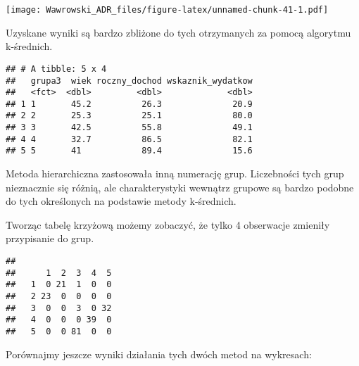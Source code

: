 \documentclass[]{book}
\newenvironment{Shaded}{\begin{snugshade}}{\end{snugshade}}
\newcommand{\KeywordTok}[1]{\textcolor[rgb]{0.13,0.29,0.53}{\textbf{#1}}}
\newcommand{\DataTypeTok}[1]{\textcolor[rgb]{0.13,0.29,0.53}{#1}}
\newcommand{\StringTok}[1]{\textcolor[rgb]{0.31,0.60,0.02}{#1}}
\newcommand{\OperatorTok}[1]{\textcolor[rgb]{0.81,0.36,0.00}{\textbf{#1}}}
\newcommand{\NormalTok}[1]{#1}
\begin{document}
\texttt{[image: Wawrowski\_ADR\_files/figure-latex/unnamed-chunk-41-1.pdf]}

Uzyskane wyniki są bardzo zbliżone do tych otrzymanych za pomocą
algorytmu k-średnich.

\begin{Shaded}
\end{Shaded}

\begin{verbatim}
## # A tibble: 5 x 4
##   grupa3  wiek roczny_dochod wskaznik_wydatkow
##   <fct>  <dbl>         <dbl>             <dbl>
## 1 1       45.2          26.3              20.9
## 2 2       25.3          25.1              80.0
## 3 3       42.5          55.8              49.1
## 4 4       32.7          86.5              82.1
## 5 5       41            89.4              15.6
\end{verbatim}

Metoda hierarchiczna zastosowała inną numerację grup. Liczebności tych
grup nieznacznie się różnią, ale charakterystyki wewnątrz grupowe są
bardzo podobne do tych określonych na podstawie metody k-średnich.

Tworząc tabelę krzyżową możemy zobaczyć, że tylko 4 obserwacje zmieniły
przypisanie do grup.

\begin{Shaded}
\end{Shaded}

\begin{verbatim}
##    
##      1  2  3  4  5
##   1  0 21  1  0  0
##   2 23  0  0  0  0
##   3  0  0  3  0 32
##   4  0  0  0 39  0
##   5  0  0 81  0  0
\end{verbatim}

Porównajmy jeszcze wyniki działania tych dwóch metod na wykresach:
\end{document}
